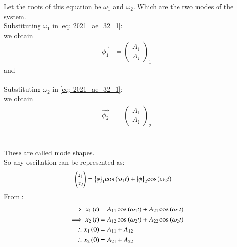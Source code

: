 \documentclass[journal,12pt,twocolumn]{IEEEtran}
\theoremstyle{remark}
\begin{document}
Let the roots of this equation be $ \omega_1$ and $ \omega_2$. Which are the two modes of the system.\\
Substituting $ \omega_1$ in \eqref{eq: 2021_ae_32_1}:\\
we obtain 
\begin{align}
 \vec{\phi_1}&= \begin{pmatrix}
A_1\\
A_2
\end{pmatrix}_1
\end{align}
and \\\\
Substituting $ \omega_2$ in \eqref{eq: 2021_ae_32_1}:\\
we obtain 
\begin{align}
 \vec{\phi_2}&=\begin{pmatrix}
A_1\\
A_2
\end{pmatrix}_2 
\end{align}
\\\\
These are called mode shapes.\\
So any oscillation can be represented as:
\begin{align}
\begin{pmatrix}
x_1\\
x_2
\end{pmatrix}
&= \bigl\{ \phi \bigl\}_1\cos{\ensuremath{\left(\omega_1 t\right)}} +\bigl\{ \phi \bigl\}_2\cos{\ensuremath{\left(\omega_2 t\right)}}
\end{align}
From :
\begin{align}
\implies x_1\left(t\right)&= A_{11}\cos{\ensuremath{\left(\omega_1 t\right)}} + A_{21}\cos{\ensuremath{\left(\omega_1 t\right)}}\\
\implies x_2\left(t\right)&= A_{12}\cos{\ensuremath{\left(\omega_2 t\right)}} + A_{22}\cos{\ensuremath{\left(\omega_2 t\right)}}\\
\therefore x_1\left(0\right) &= A_{11} + A_{12}\\
\therefore x_2\left(0\right) &= A_{21} + A_{22}
\end{align}
\end{document}

